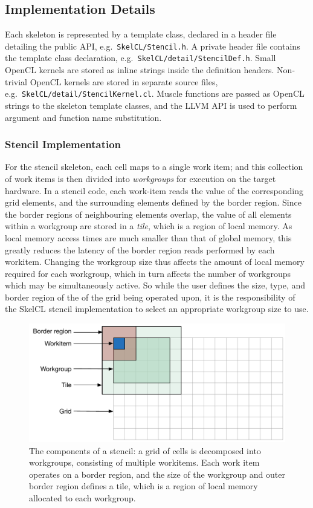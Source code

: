 \subsection{Implementation Details}

Each skeleton is represented by a template class, declared in a header
file detailing the public API, e.g.\ \texttt{SkelCL/Stencil.h}. A
private header file contains the template class declaration, e.g.\
\texttt{SkelCL/detail/StencilDef.h}. Small OpenCL kernels are stored
as inline strings inside the definition headers. Non-trivial OpenCL
kernels are stored in separate source files, e.g.\
\texttt{SkelCL/detail/StencilKernel.cl}. Muscle functions are passed
as OpenCL strings to the skeleton template classes, and the LLVM API
is used to perform argument and function name substitution.

\subsubsection{Stencil Implementation}

For the stencil skeleton, each cell maps to a single work item; and
this collection of work items is then divided into \emph{workgroups}
for execution on the target hardware. In a stencil code, each
work-item reads the value of the corresponding grid elements, and the
surrounding elements defined by the border region. Since the border
regions of neighbouring elements overlap, the value of all elements
within a workgroup are stored in a \emph{tile}, which is a region of
local memory. As local memory access times are much smaller than that
of global memory, this greatly reduces the latency of the border
region reads performed by each workitem. Changing the workgroup size
thus affects the amount of local memory required for each workgroup,
which in turn affects the number of workgroups which may be
simultaneously active. So while the user defines the size, type, and
border region of the of the grid being operated upon, it is the
responsibility of the SkelCL stencil implementation to select an
appropriate workgroup size to use.

\begin{figure}
\centering
\includegraphics[width=.75\textwidth]{img/stencil-wg}
\caption[Workgroup decomposition in stencils]{%
  The components of a stencil: a grid of cells is decomposed into
  workgroups, consisting of multiple workitems. Each work item
  operates on a border region, and the size of the workgroup and outer
  border region defines a tile, which is a region of local memory
  allocated to each workgroup.%
}
\label{fig:stencil-wg}
\end{figure}


